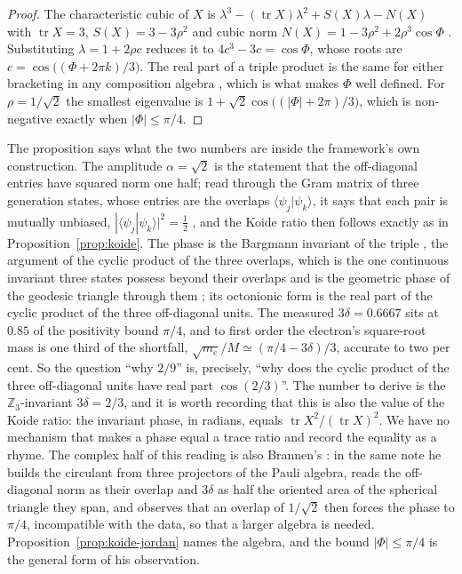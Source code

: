 \begin{proof}
The characteristic cubic of $X$ is $\lambda^3 - (\operatorname{tr}X)\lambda^2 + S(X)\lambda -
N(X)$ with $\operatorname{tr}X = 3$, $S(X) = 3 - 3\rho^2$ and cubic norm $N(X) = 1 - 3\rho^2 +
2\rho^3\cos\Phi$ \autocite{baez2002octonions}. Substituting $\lambda = 1 + 2\rho c$ reduces it
to $4c^3 - 3c = \cos\Phi$, whose roots are $c = \cos\bigl((\Phi + 2\pi k)/3\bigr)$. The real
part of a triple product is the same for either bracketing in any composition algebra
\autocite{springerOctonionsJordanAlgebras2000}, which is what makes $\Phi$ well defined. For $\rho =
1/\sqrt2$ the smallest eigenvalue is $1 + \sqrt2\cos\bigl((|\Phi| + 2\pi)/3\bigr)$, which is
non-negative exactly when $|\Phi| \le \pi/4$.
\end{proof}

The proposition says what the two numbers are inside the framework's own construction. The
amplitude $\alpha = \sqrt2$ is the statement that the off-diagonal entries have squared norm one
half; read through the Gram matrix of three generation states, whose entries are the overlaps
$\langle\psi_j|\psi_k\rangle$, it says that each pair is mutually unbiased,
$|\langle\psi_j|\psi_k\rangle|^2 = \tfrac12$
\autocite{woottersOptimalStatedeterminationMutually1989,durtMutuallyUnbiasedBases2010}, and the
Koide ratio then follows exactly as in Proposition~\ref{prop:koide}. The phase is the Bargmann
invariant of the triple \autocite{bargmannNoteWignersTheorem1964}, the argument of the cyclic
product of the three overlaps, which is the one continuous invariant three states possess beyond
their overlaps and is the geometric phase of the geodesic triangle through them
\autocite{pancharatnamGeneralizedTheoryInterference1956,mukundaQuantumKinematicApproach1993};
its octonionic form is the real part of the cyclic product of the three off-diagonal units. The
measured $3\delta = 0.6667$ sits at $0.85$ of the positivity bound $\pi/4$, and to first order
the electron's square-root mass is one third of the shortfall, $\sqrt{m_e}/M \simeq (\pi/4 -
3\delta)/3$, accurate to two per cent. So the question ``why $2/9$'' is, precisely, ``why does
the cyclic product of the three off-diagonal units have real part $\cos(2/3)$''. The number to
derive is the $\mathbb{Z}_3$-invariant $3\delta = 2/3$, and it is worth recording that this is
also the value of the Koide ratio: the invariant phase, in radians, equals
$\operatorname{tr}X^2/(\operatorname{tr}X)^2$. We have no mechanism that makes a phase equal a
trace ratio and record the equality as a rhyme. The complex half of this reading is also
Brannen's \autocite{brannen2006lepton}: in the same note he builds the circulant from three
projectors of the Pauli algebra, reads the off-diagonal norm as their overlap and $3\delta$ as
half the oriented area of the spherical triangle they span, and observes that an overlap of
$1/\sqrt2$ then forces the phase to $\pi/4$, incompatible with the data, so that a larger
algebra is needed. Proposition~\ref{prop:koide-jordan} names the algebra, and the bound $|\Phi|
\le \pi/4$ is the general form of his observation.

